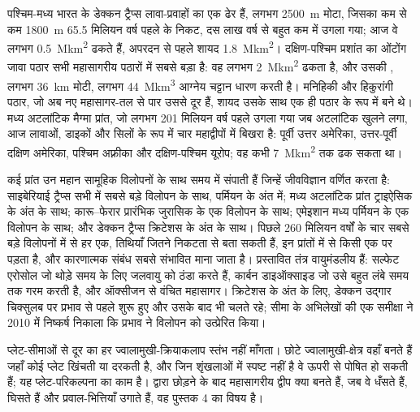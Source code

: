 पश्चिम-मध्य भारत के डेक्कन ट्रैप्स लावा-प्रवाहों का एक ढेर हैं, लगभग \qty{2500}{m} मोटा, जिसका कम से कम \qty{1800}{m} 65.5 मिलियन वर्ष पहले के निकट, दस लाख वर्ष से बहुत कम में उगला गया; आज वे लगभग \qty{0.5}{\mega km^2} ढकते हैं, अपरदन से पहले शायद \qty{1.8}{\mega km^2}। दक्षिण-पश्चिम प्रशांत का ओंटोंग जावा पठार सभी महासागरीय पठारों में सबसे बड़ा है: वह लगभग \qty{2}{\mega km^2} ढकता है, और उसकी , लगभग \qty{36}{km} मोटी, लगभग \qty{44}{\mega km^3} आग्नेय चट्टान धारण करती है। मनिहिकी और हिकुरांगी पठार, जो अब नए महासागर-तल से पार उससे दूर हैं, शायद उसके साथ एक ही पठार के रूप में बने थे। मध्य अटलांटिक मैग्मा प्रांत, जो लगभग 201 मिलियन वर्ष पहले उगला गया जब अटलांटिक खुलने लगा, आज लावाओं, डाइकों और सिलों के रूप में चार महाद्वीपों में बिखरा है: पूर्वी उत्तर अमेरिका, उत्तर-पूर्वी दक्षिण अमेरिका, पश्चिम अफ़्रीका और दक्षिण-पश्चिम यूरोप; वह कभी \qty{7}{\mega km^2} तक ढक सकता था।


कई प्रांत उन महान सामूहिक विलोपनों के साथ समय में संपाती हैं जिन्हें जीवविज्ञान वर्णित करता है: साइबेरियाई ट्रैप्स सभी में सबसे बड़े विलोपन के साथ, पर्मियन के अंत में; मध्य अटलांटिक प्रांत ट्राइऐसिक के अंत के साथ; कारू–फेरार प्रारंभिक जुरासिक के एक विलोपन के साथ; एमेइशान मध्य पर्मियन के एक विलोपन के साथ; और डेक्कन ट्रैप्स क्रिटेशस के अंत के साथ। पिछले 260 मिलियन वर्षों के चार सबसे बड़े विलोपनों में से हर एक, तिथियाँ जितने निकटता से बता सकती हैं, इन प्रांतों में से किसी एक पर पड़ता है, और कारणात्मक संबंध सबसे संभावित माना जाता है। प्रस्तावित तंत्र वायुमंडलीय हैं: सल्फेट एरोसोल जो थोड़े समय के लिए जलवायु को ठंडा करते हैं, कार्बन डाइऑक्साइड जो उसे बहुत लंबे समय तक गरम करती है, और ऑक्सीजन से वंचित महासागर। क्रिटेशस के अंत के लिए, डेक्कन उद्गार चिक्सुलब पर प्रभाव से पहले शुरू हुए और उसके बाद भी चलते रहे; सीमा के अभिलेखों की एक समीक्षा ने 2010 में निष्कर्ष निकाला कि प्रभाव ने विलोपन को उत्प्रेरित किया।

प्लेट-सीमाओं से दूर का हर ज्वालामुखी-क्रियाकलाप स्तंभ नहीं माँगता। छोटे ज्वालामुखी-क्षेत्र वहाँ बनते हैं जहाँ कोई प्लेट खिंचती या दरकती है, और जिन शृंखलाओं में स्पष्ट  नहीं है वे ऊपरी  से पोषित हो सकती हैं; यह प्लेट-परिकल्पना का काम है।  द्वारा छोड़ने के बाद महासागरीय द्वीप क्या बनते हैं, जब वे धँसते हैं, घिसते हैं और प्रवाल-भित्तियाँ उगाते हैं, वह पुस्तक 4 का विषय है।


